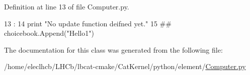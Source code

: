 Definition at line 13 of file Computer.py.


\begin{DoxyCode}
13                     :
14         print "No update function deifned yet."
15 
##         choicebook.Append("Hello1")
\end{DoxyCode}


The documentation for this class was generated from the following file:\begin{DoxyCompactItemize}
\item 
/home/eleclhcb/LHCb/lbcat-\/cmake/CatKernel/python/element/\hyperlink{Computer_8py}{Computer.py}\end{DoxyCompactItemize}
